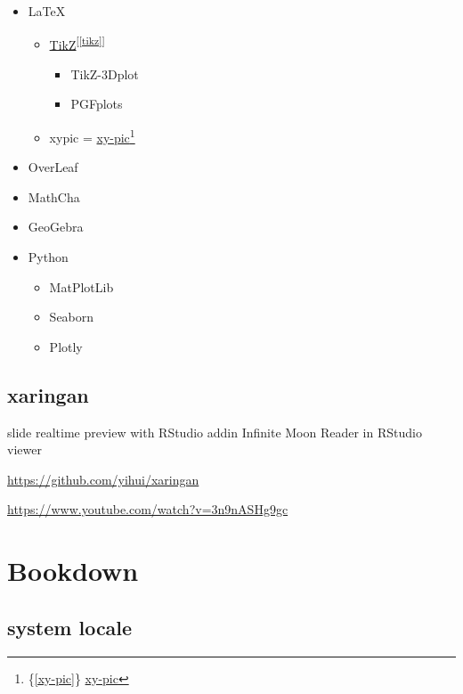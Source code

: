\documentclass[
]{book}
\providecommand{\tightlist}{%
  \setlength{\itemsep}{0pt}\setlength{\parskip}{0pt}}
\theoremstyle{definition}
\theoremstyle{definition}
\theoremstyle{definition}
\theoremstyle{definition}
\theoremstyle{remark}
\begin{document}
\begin{itemize}
\tightlist
\item
  LaTeX

  \begin{itemize}
  \tightlist
  \item
    \protect\hyperlink{tikz}{TikZ}\textsuperscript{{[}\ref{tikz}{]}}

    \begin{itemize}
    \tightlist
    \item
      TikZ-3Dplot
    \item
      PGFplots
    \end{itemize}
  \item
    xypic = \protect\hyperlink{xy-pic}{xy-pic}\footnote{\{\ref{xy-pic}\} \protect\hyperlink{xy-pic}{xy-pic}}
  \end{itemize}
\item
  OverLeaf
\item
  MathCha
\item
  GeoGebra
\item
  Python

  \begin{itemize}
  \tightlist
  \item
    MatPlotLib
  \item
    Seaborn
  \item
    Plotly
  \end{itemize}
\end{itemize}

\hypertarget{xaringan}{%
\subsection{xaringan}\label{xaringan}}

slide realtime preview with RStudio addin Infinite Moon Reader in RStudio viewer

\url{https://github.com/yihui/xaringan}

\url{https://www.youtube.com/watch?v=3n9nASHg9gc}

\hypertarget{bookdown}{%
\section{Bookdown}\label{bookdown}}

\hypertarget{system-locale}{%
\subsection{system locale}\label{system-locale}}
\end{document}

